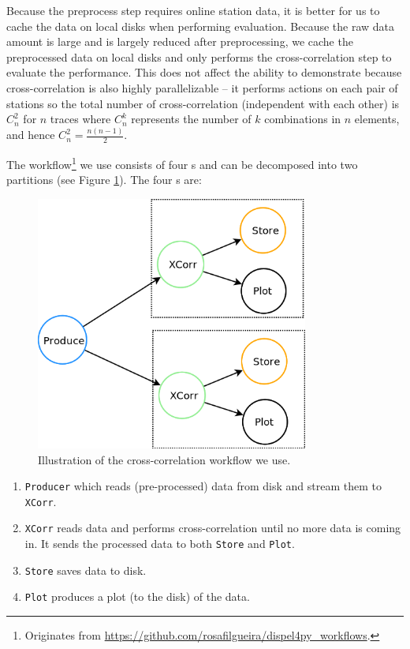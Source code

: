 Because the preprocess step requires online station data, it is better for us to cache the data on local disks when performing evaluation. Because the raw data amount is large and is largely reduced after preprocessing, we cache the preprocessed data on local disks and only performs the cross-correlation step to evaluate the performance. This does not affect the ability to demonstrate because cross-correlation is also highly parallelizable -- it performs actions on each pair of stations so the total number of cross-correlation (independent with each other) is $C^2_n$ for $n$ traces where $C^k_n$ represents the number of $k$ combinations in $n$ elements, and hence $C^2_n=\frac{n(n-1)}{2}$.

The workflow\footnote{Originates from \url{https://github.com/rosafilgueira/dispel4py_workflows}.} we use consists of four \tPETmpl{}s and can be decomposed into two partitions (see Figure \ref{fig:wf_xcorr_us}). The four \tPETmpl{}s are:

\begin{figure}[h]
\centering
    \includegraphics[width=0.8\textwidth]{figures/wf_xcorr_us}
\caption{Illustration of the cross-correlation workflow we use.}
\label{fig:wf_xcorr_us}
\end{figure}

\begin{enumerate}
	\item \lstinline|Producer| which reads (pre-processed) data from disk and stream them to \lstinline|XCorr|.
	\item \lstinline|XCorr| reads data and performs cross-correlation until no more data is coming in. It sends the processed data to both \lstinline|Store| and \lstinline|Plot|.
	\item \lstinline|Store| saves data to disk.
	\item \lstinline|Plot| produces a plot (to the disk) of the data.
\end{enumerate}

